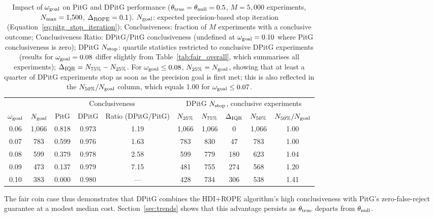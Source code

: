 \begin{table}[h!]
  \begin{center}
  \begin{tabular}{c|c|c|c|c|c|c|c|c|c}
    \hline
    & & \multicolumn{3}{c|}{Conclusiveness} & \multicolumn{5}{c}{DPitG $N_{\rm stop}$, conclusive experiments} \\
    $\omega_{\rm goal}$ & $N_{\rm goal}$ & PitG & DPitG & Ratio (DPitG/PitG) & $N_{\rm 25\%}$ & $N_{\rm 75\%}$ & $\Delta_{\rm IQR}$ & $N_{\rm 50\%}$ & $N_{\rm 50\%}/N_{\rm goal}$\\
    \hline
    0.06 & 1{,}066 & 0.818 & 0.973 & 1.19 & 1{,}066 & 1{,}066 &   0 & 1{,}066 & 1.00\\
    0.07 &   783   & 0.599 & 0.976 & 1.63 &   783   &   830   &  47 &   783   & 1.00\\
    0.08 &   599   & 0.379 & 0.978 & 2.58 &   599   &   779   & 180 &   623   & 1.04\\
    0.09 &   473   & 0.137 & 0.979 & 7.15 &   481   &   755   & 274 &   568   & 1.20\\
    0.10 &   383   & 0.000 & 0.980 & ---  &   428   &   734   & 306 &   538   & 1.41\\
    \hline
  \end{tabular}
  \caption{Impact of $\omega_{\rm goal}$ on PitG and DPitG performance
  ($\theta_{\rm true}=\theta_{\rm null}=0.5$, $M=5{,}000$ experiments,
  $N_{\rm max}=1{,}500$, $\Delta_{\rm ROPE}=0.1$).
  $N_{\rm goal}$: expected precision-based stop iteration (Equation~\ref{eq:pitg_stop_iteration});
  Conclusiveness: fraction of $M$ experiments with a conclusive outcome;
  Conclusiveness Ratio: DPitG/PitG conclusiveness (undefined at $\omega_{\rm goal}=0.10$
  where PitG conclusiveness is zero);
  DPitG $N_{\rm stop}$: quartile statistics restricted to conclusive DPitG experiments
  (results for $\omega_{\rm goal}=0.08$ differ slightly from Table~\ref{tab:fair_overall},
  which summarises all experiments);
  $\Delta_{\rm IQR} = N_{\rm 75\%} - N_{\rm 25\%}$.
  For $\omega_{\rm goal} \le 0.08$, $N_{\rm 25\%} = N_{\rm goal}$, showing that at least
  a quarter of DPitG experiments stop as soon as the precision goal is first met; this is
  also reflected in the $N_{\rm 50\%}/N_{\rm goal}$ column, which equals 1.00 for
  $\omega_{\rm goal} \le 0.07$.}
  \label{tab:goal_impact}
\end{center}
\end{table}

The fair coin case thus demonstrates that DPitG combines the HDI+ROPE algorithm's high
conclusiveness with PitG's zero-false-reject guarantee at a modest median cost.
Section~\ref{sec:trends} shows that this advantage persists as $\theta_{\rm true}$
departs from $\theta_{\rm null}$.

